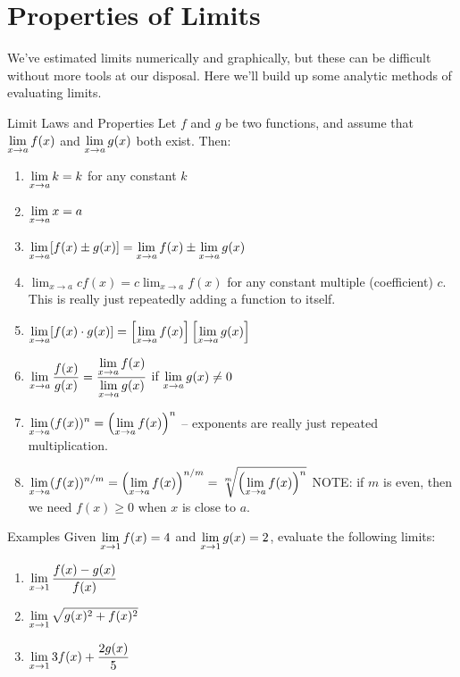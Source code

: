 \section{Properties of Limits}

We've estimated limits numerically and graphically, but these can be difficult without more tools at our disposal. Here we'll build up some analytic methods of evaluating limits.

\begin{thm}{Limit Laws and Properties}
Let $f$ and $g$ be two functions, and assume that $\displaystyle \lim_{x\to a} f(x)$ and $\displaystyle \lim_{x\to a} g(x)$ both exist. Then:
\begin{enumerate}
\item $\displaystyle \lim_{x\to a} k = k$ for any constant $k$
\item $\displaystyle \lim_{x\to a} x = a$
\item $\displaystyle \lim_{x\to a} [f(x)\pm g(x)] = \lim_{x\to a} f(x) \pm \lim_{x\to a} g(x)$
\item $\displaystyle\lim_{x\to a} cf(x) = c\lim_{x\to a} f(x)$ for any constant multiple (coefficient) $c$. This is really just repeatedly adding a function to itself.
\item $\displaystyle \lim_{x\to a} [f(x)\cdot g(x)] = \left[\lim_{x\to a} f(x)\right] \left[\lim_{x\to a} g(x)\right]$
\item $\displaystyle \lim_{x\to a} \frac{f(x)}{g(x)} = \frac{\displaystyle \lim_{x\to a} f(x)}{\displaystyle \lim_{x\to a} g(x)}$ if $\displaystyle \lim_{x\to a} g(x)\neq0$
\item $\displaystyle \lim_{x\to a} (f(x))^n = \left(\displaystyle \lim_{x\to a} f(x) \right)^n$ -- exponents are really just repeated multiplication.
\item $\displaystyle \lim_{x\to a} (f(x))^{n/m} = \left(\lim_{x\to a} f(x)\right)^{n/m} = \sqrt[m]{\left(\lim_{x\to a}f(x)\right)^n}$ NOTE: if $m$ is even, then we need $f(x)\geq 0$ when $x$ is close to $a$.
\end{enumerate}
\end{thm}

\begin{note}{Examples}
Given $\displaystyle \lim_{x\to 1} f(x) = 4$ and $\displaystyle \lim_{x\to 1} g(x) = 2$, evaluate the following limits:
\begin{enumerate}
\item $\displaystyle \lim_{x\to 1}\dfrac{f(x)-g(x)}{f(x)}$
\item $\displaystyle \lim_{x\to 1} \sqrt{g(x)^2+f(x)^2}$
\item $\displaystyle \lim_{x\to 1} 3f(x)+\dfrac{2g(x)}{5}$
\end{enumerate}
\end{note}
